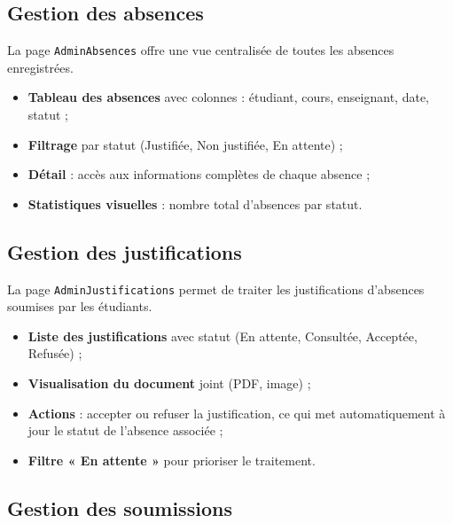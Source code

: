 
\subsection{Gestion des absences}

La page \texttt{AdminAbsences} offre une vue centralisée de toutes les absences enregistrées.

\begin{itemize}[noitemsep]
    \item \textbf{Tableau des absences} avec colonnes : étudiant, cours, enseignant, date, statut ;
    \item \textbf{Filtrage} par statut (Justifiée, Non justifiée, En attente) ;
    \item \textbf{Détail} : accès aux informations complètes de chaque absence ;
    \item \textbf{Statistiques visuelles} : nombre total d'absences par statut.
\end{itemize}

\subsection{Gestion des justifications}

La page \texttt{AdminJustifications} permet de traiter les justifications d'absences soumises par les étudiants.

\begin{itemize}[noitemsep]
    \item \textbf{Liste des justifications} avec statut (En attente, Consultée, Acceptée, Refusée) ;
    \item \textbf{Visualisation du document} joint (PDF, image) ;
    \item \textbf{Actions} : accepter ou refuser la justification, ce qui met automatiquement à jour le statut de l'absence associée ;
    \item \textbf{Filtre « En attente »} pour prioriser le traitement.
\end{itemize}

\subsection{Gestion des soumissions}

